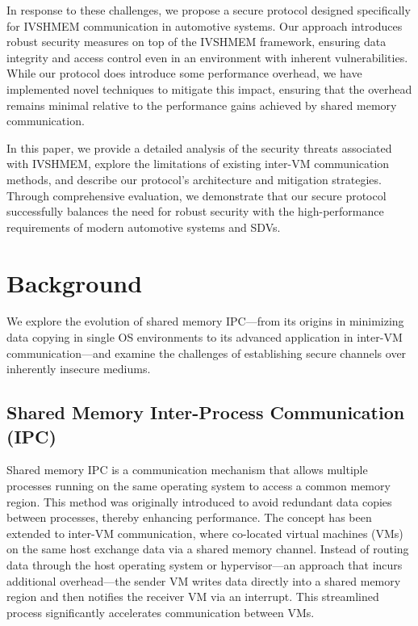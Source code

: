 \documentclass[conference]{IEEEtran}
\begin{document}
In response to these challenges, we propose a secure protocol designed specifically for IVSHMEM communication in automotive systems. Our approach introduces robust security measures on top of the IVSHMEM framework, ensuring data integrity and access control even in an environment with inherent vulnerabilities. While our protocol does introduce some performance overhead, we have implemented novel techniques to mitigate this impact, ensuring that the overhead remains minimal relative to the performance gains achieved by shared memory communication.

In this paper, we provide a detailed analysis of the security threats associated with IVSHMEM, explore the limitations of existing inter-VM communication methods, and describe our protocol's architecture and mitigation strategies. Through comprehensive evaluation, we demonstrate that our secure protocol successfully balances the need for robust security with the high-performance requirements of modern automotive systems and SDVs.


\section{Background}

We explore the evolution of shared memory IPC—from its origins in minimizing data copying in single OS environments to its advanced application in inter-VM communication—and examine the challenges of establishing secure channels over inherently insecure mediums.

\subsection{Shared Memory Inter-Process Communication (IPC)}

Shared memory IPC is a communication mechanism that allows multiple processes running on the same operating system to access a common memory region. This method was originally introduced to avoid redundant data copies between processes, thereby enhancing performance. The concept has been extended to inter-VM communication, where co-located virtual machines (VMs) on the same host exchange data via a shared memory channel. Instead of routing data through the host operating system or hypervisor—an approach that incurs additional overhead—the sender VM writes data directly into a shared memory region and then notifies the receiver VM via an interrupt. This streamlined process significantly accelerates communication between VMs.
\end{document}
